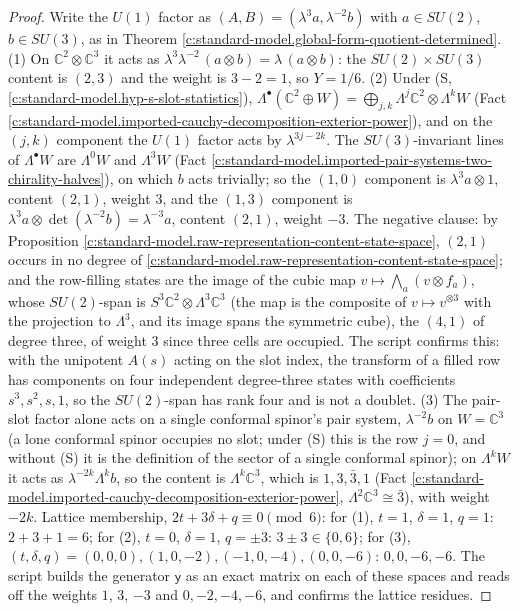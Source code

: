 \documentclass[11pt]{article}
\theoremstyle{definition}
\theoremstyle{plain}
\providecommand{\C}{}\renewcommand{\C}{\mathbb{C}}
\begin{document}
\begin{proof}
Write the $U(1)$ factor as $(A, B) = (\lambda^{3}a, \lambda^{-2}b)$ with $a \in SU(2)$, $b \in SU(3)$, as in Theorem \ref{c:standard-model.global-form-quotient-determined}. (1) On $\C^{2} \otimes \C^{3}$ it acts as $\lambda^{3}\lambda^{-2}\,(a \otimes b) = \lambda\,(a \otimes b)$: the $SU(2) \times SU(3)$ content is $(2,3)$ and the weight is $3 - 2 = 1$, so $Y = 1/6$. (2) Under (S, \ref{c:standard-model.hyp-s-slot-statistics}), $\Lambda^{\bullet}(\C^{2} \oplus W) = \bigoplus_{j,k}\Lambda^{j}\C^{2} \otimes \Lambda^{k}W$ (Fact \ref{c:standard-model.imported-cauchy-decomposition-exterior-power}), and on the $(j, k)$ component the $U(1)$ factor acts by $\lambda^{3j - 2k}$. The $SU(3)$-invariant lines of $\Lambda^{\bullet}W$ are $\Lambda^{0}W$ and $\Lambda^{3}W$ (Fact \ref{c:standard-model.imported-pair-systems-two-chirality-halves}), on which $b$ acts trivially; so the $(1, 0)$ component is $\lambda^{3}a \otimes 1$, content $(2,1)$, weight $3$, and the $(1, 3)$ component is $\lambda^{3}a \otimes \det(\lambda^{-2}b) = \lambda^{-3}a$, content $(2,1)$, weight $-3$. The negative clause: by Proposition \ref{c:standard-model.raw-representation-content-state-space}, $(2,1)$ occurs in no degree of \ref{c:standard-model.raw-representation-content-state-space}; and the row-filling states are the image of the cubic map $v \mapsto \bigwedge_{a}(v \otimes f_{a})$, whose $SU(2)$-span is $S^{3}\C^{2} \otimes \Lambda^{3}\C^{3}$ (the map is the composite of $v \mapsto v^{\otimes 3}$ with the projection to $\Lambda^{3}$, and its image spans the symmetric cube), the $(4,1)$ of degree three, of weight $3$ since three cells are occupied. The script confirms this: with the unipotent $A(s)$ acting on the slot index, the transform of a filled row has components on four independent degree-three states with coefficients $s^{3}, s^{2}, s, 1$, so the $SU(2)$-span has rank four and is not a doublet. (3) The pair-slot factor alone acts on a single conformal spinor's pair system, $\lambda^{-2}b$ on $W = \C^{3}$ (a lone conformal spinor occupies no slot; under (S) this is the row $j = 0$, and without (S) it is the definition of the sector of a single conformal spinor); on $\Lambda^{k}W$ it acts as $\lambda^{-2k}\Lambda^{k}b$, so the content is $\Lambda^{k}\C^{3}$, which is $1, 3, \bar{3}, 1$ (Fact \ref{c:standard-model.imported-cauchy-decomposition-exterior-power}, $\Lambda^{2}\C^{3} \cong \bar{3}$), with weight $-2k$. Lattice membership, $2t + 3\delta + q \equiv 0 \pmod 6$: for (1), $t = 1$, $\delta = 1$, $q = 1$: $2 + 3 + 1 = 6$; for (2), $t = 0$, $\delta = 1$, $q = \pm 3$: $3 \pm 3 \in \{0, 6\}$; for (3), $(t, \delta, q) = (0, 0, 0), (1, 0, -2), (-1, 0, -4), (0, 0, -6)$: $0, 0, -6, -6$. The script builds the generator $\mathsf{y}$ as an exact matrix on each of these spaces and reads off the weights $1$, $3$, $-3$ and $0, -2, -4, -6$, and confirms the lattice residues.

\end{proof}
\end{document}
